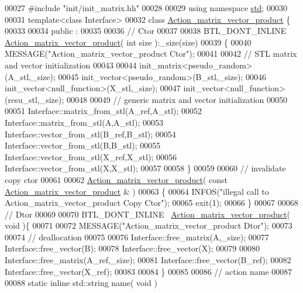 \begin{DoxyCode}
00027 \textcolor{preprocessor}{#include "init/init\_matrix.hh"}
00028 
00029 \textcolor{keyword}{using namespace }\hyperlink{namespacestd}{std};
00030 
00031 \textcolor{keyword}{template}<\textcolor{keyword}{class} Interface>
00032 \textcolor{keyword}{class }\hyperlink{class_action__matrix__vector__product}{Action\_matrix\_vector\_product} \{
00033 
00034 public :
00035 
00036   \textcolor{comment}{// Ctor}
00037 
00038   BTL\_DONT\_INLINE \hyperlink{class_action__matrix__vector__product}{Action\_matrix\_vector\_product}( \textcolor{keywordtype}{int} size ):\_size(size)
00039   \{
00040     MESSAGE(\textcolor{stringliteral}{"Action\_matrix\_vector\_product Ctor"});
00041 
00042     \textcolor{comment}{// STL matrix and vector initialization}
00043 
00044     init\_matrix<pseudo\_random>(A\_stl,\_size);
00045     init\_vector<pseudo\_random>(B\_stl,\_size);
00046     init\_vector<null\_function>(X\_stl,\_size);
00047     init\_vector<null\_function>(resu\_stl,\_size);
00048 
00049     \textcolor{comment}{// generic matrix and vector initialization}
00050 
00051     Interface::matrix\_from\_stl(A\_ref,A\_stl);
00052     Interface::matrix\_from\_stl(A,A\_stl);
00053     Interface::vector\_from\_stl(B\_ref,B\_stl);
00054     Interface::vector\_from\_stl(B,B\_stl);
00055     Interface::vector\_from\_stl(X\_ref,X\_stl);
00056     Interface::vector\_from\_stl(X,X\_stl);
00057 
00058   \}
00059 
00060   \textcolor{comment}{// invalidate copy ctor}
00061 
00062   \hyperlink{class_action__matrix__vector__product}{Action\_matrix\_vector\_product}( \textcolor{keyword}{const}  
      \hyperlink{class_action__matrix__vector__product}{Action\_matrix\_vector\_product} & )
00063   \{
00064     INFOS(\textcolor{stringliteral}{"illegal call to Action\_matrix\_vector\_product Copy Ctor"});
00065     exit(1);
00066   \}
00067 
00068   \textcolor{comment}{// Dtor}
00069 
00070   BTL\_DONT\_INLINE ~\hyperlink{class_action__matrix__vector__product}{Action\_matrix\_vector\_product}( \textcolor{keywordtype}{void} )\{
00071 
00072     MESSAGE(\textcolor{stringliteral}{"Action\_matrix\_vector\_product Dtor"});
00073 
00074     \textcolor{comment}{// deallocation}
00075 
00076     Interface::free\_matrix(A,\_size);
00077     Interface::free\_vector(B);
00078     Interface::free\_vector(X);
00079 
00080     Interface::free\_matrix(A\_ref,\_size);
00081     Interface::free\_vector(B\_ref);
00082     Interface::free\_vector(X\_ref);
00083 
00084   \}
00085 
00086   \textcolor{comment}{// action name}
00087 
00088   \textcolor{keyword}{static} \textcolor{keyword}{inline} std::string name( \textcolor{keywordtype}{void} )

\end{DoxyCode}
